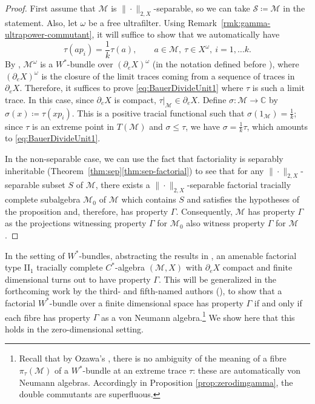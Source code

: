 \documentclass[a4paper,11pt]{amsart}
\theoremstyle{definition}
\numberwithin{equation}{section}
\numberwithin{theorem}{section}
\newcommand{\C}{\mathbb C}
\newcommand{\M}{\mathcal{M}}
\begin{document}
\begin{proof}
First assume that $\M$ is $\|\cdot\|_{2,X}$-separable, so we can take $\mathcal S\coloneqq\M$ in the statement.
Also, let $\omega$ be a free ultrafilter.
Using Remark~\ref{rmk:gamma-ultrapower-commutant}, it will suffice to show that we automatically have 
\begin{equation}
\label{eq:BauerDivideUnit1}
    \tau(ap_i) = \frac1k\tau(a),\qquad a\in \mathcal M,\ \tau \in X^\omega,\ i = 1, \ldots k.
\end{equation}
By \cite[Proposition~3.9]{BBSTWW}, $\M^\omega$ is a $W^*$-bundle over $(\partial_e X)^\omega$ (in the notation defined before \cite[Proposition~3.9]{BBSTWW}), where $(\partial_e X)^\omega$ is the closure of the limit traces coming from a sequence of traces in $\partial_e X$.
Therefore, it suffices to prove \eqref{eq:BauerDivideUnit1} where $\tau$ is such a limit trace. 
In this case, since $\partial_e X$ is compact, $\tau|_{\M} \in \partial_e X$.
Define $\sigma\colon \M \to \C$ by $\sigma(x)\coloneqq \tau(xp_i)$.
This is a positive tracial functional such that $\sigma(1_{\M})=\frac1k$; since $\tau$ is an extreme point in $T(\M)$ and $\sigma\leq\tau$, we have $\sigma=\frac1k\tau$, which amounts to \eqref{eq:BauerDivideUnit1}.

In the non-separable case, we can use the fact that factoriality is separably inheritable (Theorem~\ref{thm:sep}\ref{thm:sep-factorial}) to see that for any $\|\cdot\|_{2,X}$-separable subset $S$ of $\M$, there exists a $\|\cdot\|_{2, X}$-separable factorial tracially complete subalgebra $\M_0$ of $\M$ which contains $S$ and satisfies the hypotheses of the proposition and, therefore, has property $\Gamma$.
Consequently, $\M$ has property $\Gamma$ as the projections witnessing property $\Gamma$ for $\mathcal M_0$ also witness property $\Gamma$ for $\mathcal M$.
\end{proof}

In the setting of $W^*$-bundles, abstracting the results in \cite{TWW15,Sa12,KR14}, an amenable factorial type II$_1$ tracially complete $C^*$-algebra $(\M,X)$ with $\partial_eX$ compact and finite dimensional turns out to have property $\Gamma$. This will be generalized in the forthcoming work by the third- and fifth-named authors (\cite{EvingtonSchafhauser}), to show that a factorial $W^*$-bundle over a finite dimensional space has property $\Gamma$ if and only if each fibre has property $\Gamma$ as a von Neumann algebra.\footnote{Recall that by Ozawa's \cite[Theorem 11]{Oz13}, there is no ambiguity of the meaning of a fibre $\pi_\tau(\M)$ of a $W^*$-bundle at an extreme trace $\tau$: these are automatically von Neumann algebras. Accordingly in Proposition \ref{prop:zerodimgamma}, the double commutants are superfluous.}  We show here that this holds in the zero-dimensional setting.
\end{document}
